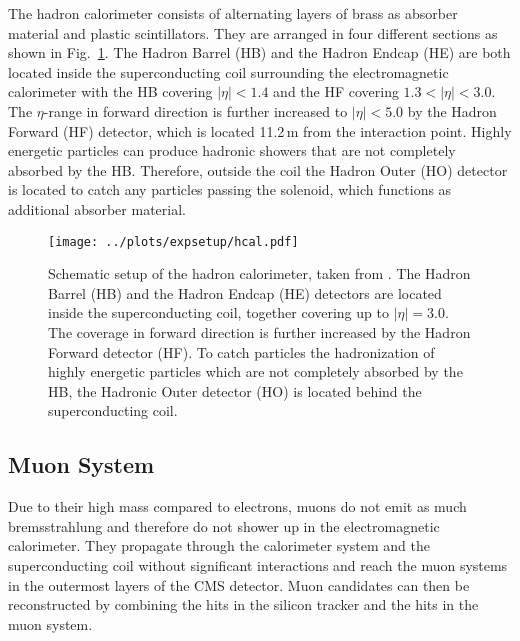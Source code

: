 \noindent The hadron calorimeter consists of alternating layers of brass as absorber material and plastic scintillators. They are arranged in four different sections as shown in Fig.~\ref{fig:expsetup:hcal}. The Hadron Barrel (HB) and the Hadron Endcap (HE) are both located inside the superconducting coil surrounding the electromagnetic calorimeter with the HB covering $|\eta|<1.4$ and the HF covering $1.3<|\eta|<3.0$. The $\eta$-range in forward direction is further increased to $|\eta|<5.0$ by the Hadron Forward (HF) detector, which is located 11.2\,m from the interaction point. Highly energetic particles can produce hadronic showers that are not completely absorbed by the HB. Therefore, outside the coil the Hadron Outer (HO) detector is located to catch any particles passing the solenoid, which functions as additional absorber material.
\begin{figure}
	\centering
	\texttt{[image: ../plots/expsetup/hcal.pdf]}
	\caption[Schematic setup of the hadron calorimeter]{Schematic setup of the hadron calorimeter, taken from \cite{hcal_fig}. The Hadron Barrel (HB) and the Hadron Endcap (HE) detectors are located inside the superconducting coil, together covering up to $|\eta|=3.0$. The coverage in forward direction is further increased by the Hadron Forward detector (HF). To catch particles the hadronization of highly energetic particles which are not completely absorbed by the HB, the Hadronic Outer detector (HO) is located behind the superconducting coil.}
	\label{fig:expsetup:hcal}
\end{figure}

\subsection*{Muon System}
Due to their high mass compared to electrons, muons do not emit as much bremsstrahlung and therefore do not shower up in the electromagnetic calorimeter. They propagate through the calorimeter system and the superconducting coil without significant interactions and reach the muon systems in the outermost layers of the CMS detector. Muon candidates can then be reconstructed by combining the hits in the silicon tracker and the hits in the muon system.\\

